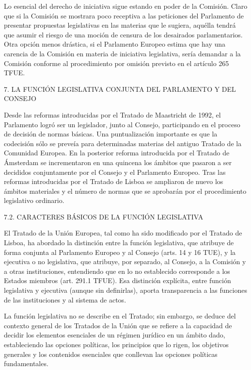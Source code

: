 \documentclass[10pt,a4paper]{article}
\begin{document}
Lo esencial del derecho de iniciativa sigue estando en poder de la Comisión. Claro que si la Comisión se mostrara poco receptiva a las peticiones del Parlamento de presentar propuestas legislativas en las materias que le sugiera, aquélla tendrá que asumir el riesgo de una moción de censura de los desairados parlamentarios. Otra opción menos drástica, si el Parlamento Europeo estima que hay una carencia de la Comisión en materia de iniciativa legislativa, sería demandar a la Comisión conforme al procedimiento por omisión previsto en el artículo 265 TFUE.


7. LA FUNCIÓN LEGISLATIVA CONJUNTA DEL PARLAMENTO Y DEL CONSEJO

Desde las reformas introducidas por el Tratado de Maastricht de 1992, el Parlamento logró ser un legislador, junto al Consejo, participando en el proceso de decisión de normas básicas. Una puntualización importante es que la codecisión sólo se preveía para determinadas materias del antiguo Tratado de la Comunidad Europea. En la posterior reforma introducida por el Tratado de Ámsterdam se incrementaron en una quincena los ámbitos que pasaron a ser decididos conjuntamente por el Consejo y el Parlamento Europeo. Tras las reformas introducidas por el Tratado de Lisboa se ampliaron de nuevo los ámbitos materiales y el número de normas que se aprobarán por el procedimiento legislativo ordinario.

7.2. CARACTERES BÁSICOS DE LA FUNCIÓN LEGISLATIVA 

El Tratado de la Unión Europea, tal como ha sido modificado por el Tratado de Lisboa, ha abordado la distinción entre la función legislativa, que atribuye de forma conjunta al Parlamento Europeo y al Consejo (arts. 14 y 16 TUE), y la ejecutiva o no legislativa, que atribuye, por separado, al Consejo, a la Comisión y a otras instituciones, entendiendo que en lo no establecido corresponde a los Estados miembros (art. 291.1 TFUE). Esa distinción explícita, entre función legislativa y ejecutiva (aunque sin definirlas), aporta transparencia a las funciones de las instituciones y al sistema de actos. 

La función legislativa no se describe en el Tratado; sin embargo, se deduce del contexto general de los Tratados de la Unión que se refiere a la capacidad de decidir los elementos esenciales de un régimen jurídico en un ámbito dado, estableciendo las opciones políticas, los principios que lo rigen, los objetivos generales y los contenidos esenciales que conllevan las opciones políticas fundamentales.
\end{document}
